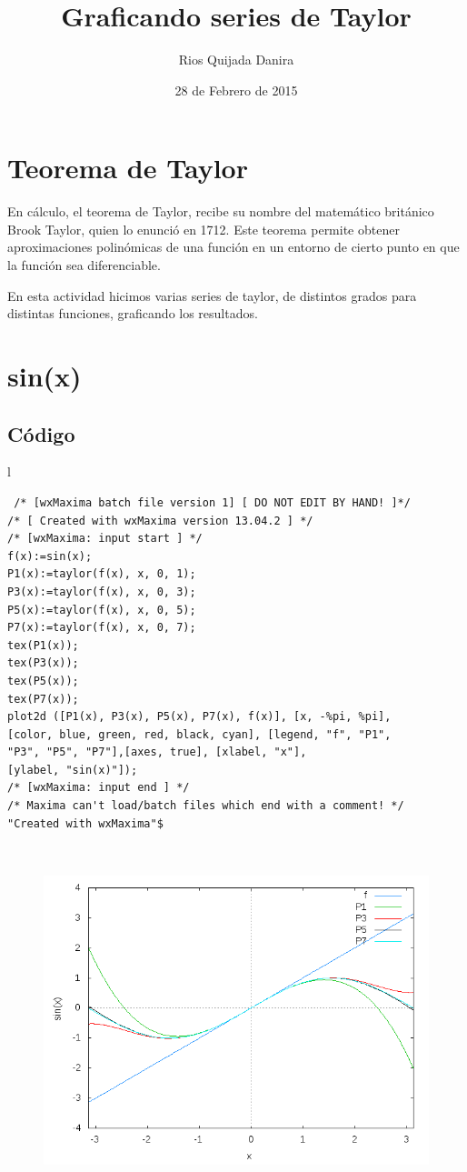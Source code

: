 \documentclass[10pt]{article}
\title{Graficando series de Taylor}
\author{Rios Quijada Danira}
\date{28 de Febrero de 2015}
\begin{document}
\maketitle
\section{Teorema de Taylor}
En cálculo, el teorema de Taylor, recibe su nombre del matemático británico Brook Taylor, quien lo enunció en 1712. Este teorema permite obtener aproximaciones polinómicas de una función en un entorno de cierto punto en que la función sea diferenciable.

En esta actividad hicimos varias series de taylor, de distintos grados para distintas funciones, graficando los resultados. 

\section{sin(x)} 
\subsection{Código}
\begin{tabular}{l}
\begin{verbatim}  
 /* [wxMaxima batch file version 1] [ DO NOT EDIT BY HAND! ]*/
/* [ Created with wxMaxima version 13.04.2 ] */
/* [wxMaxima: input start ] */
f(x):=sin(x);
P1(x):=taylor(f(x), x, 0, 1);
P3(x):=taylor(f(x), x, 0, 3);
P5(x):=taylor(f(x), x, 0, 5);
P7(x):=taylor(f(x), x, 0, 7);
tex(P1(x));
tex(P3(x));
tex(P5(x));
tex(P7(x));
plot2d ([P1(x), P3(x), P5(x), P7(x), f(x)], [x, -%pi, %pi],
[color, blue, green, red, black, cyan], [legend, "f", "P1", 
"P3", "P5", "P7"],[axes, true], [xlabel, "x"],
[ylabel, "sin(x)"]);
/* [wxMaxima: input end ] */
/* Maxima can't load/batch files which end with a comment! */
"Created with wxMaxima"$
\end{verbatim} \\

\begin{figure}
  \centering
    \includegraphics[scale=0.4]{sinx}
\end{figure}
\end{tabular}
\newpage 
\end{document}

